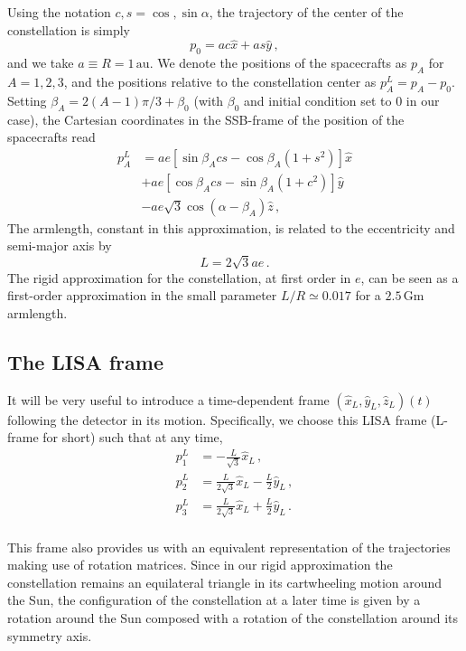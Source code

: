 \documentclass[aps,showpacs,twocolumn,prd,superscriptaddress,nofootinbib]{revtex4-1}
\newcommand{\be}{\begin{equation}}
\newcommand{\ee}{\end{equation}}
\newcommand{\bsub}{\begin{subequations}}
\newcommand{\esub}{\end{subequations}}
\newcommand{\nn}{\nonumber}
\begin{document}
Using the notation $c,s = \cos, \sin \alpha$, the trajectory of the center of the constellation is simply
\be
	p_{0} = ac \hat{x} + as \hat{y} \,,
\ee
and we take $a\equiv R = 1 \, \mathrm{au}$. We denote the positions of the spacecrafts as $p_{A}$ for $A=1,2,3$, and the positions relative to the constellation center as $p_{A}^{L} = p_{A} - p_{0}$. Setting $\beta_{A} = 2(A-1)\pi/3 + \beta_{0}$ (with $\beta_{0}$ and initial condition set to 0 in our case), the Cartesian coordinates in the SSB-frame of the position of the spacecrafts read
\bsub
\begin{align}
	p_{A}^{L} &= a e \left[ \sin \beta_{A} c s - \cos\beta_{A} \left( 1 + s^{2} \right) \right] \hat{x} \nn\\
	& + a e \left[ \cos \beta_{A} c s - \sin\beta_{A} \left( 1 + c^{2} \right) \right] \hat{y} \nn\\
	& - a e \sqrt{3} \cos(\alpha - \beta_{A}) \hat{z} \,,
\end{align}
\esub
The armlength, constant in this approximation, is related to the eccentricity and semi-major axis by
\be
	L = 2\sqrt{3} a e \,.
\ee
The rigid approximation for the constellation, at first order in $e$, can be seen as a first-order approximation in the small parameter $L/R \simeq 0.017$ for a $2.5 \, \mathrm{Gm}$ armlength.


\subsection{The LISA frame}
\label{app:LISAframe}

It will be very useful to introduce a time-dependent frame $(\hat{x}_{L}, \hat{y}_{L}, \hat{z}_{L})(t)$ following the detector in its motion. Specifically, we choose this LISA frame (L-frame for short) such that at any time,
\bsub
\begin{align}
	p_{1}^{L} &= - \frac{L}{\sqrt{3}} \hat{x}_{L} \,,\\
	p_{2}^{L} &= \frac{L}{2\sqrt{3}} \hat{x}_{L} - \frac{L}{2} \hat{y}_{L} \,,\\
	p_{3}^{L} &= \frac{L}{2\sqrt{3}} \hat{x}_{L} + \frac{L}{2} \hat{y}_{L} \,.\\
\end{align}
\esub

This frame also provides us with an equivalent representation of the trajectories making use of rotation matrices. Since in our rigid approximation the constellation remains an equilateral triangle in its cartwheeling motion around the Sun, the configuration of the constellation at a later time is given by a rotation around the Sun composed with a rotation of the constellation around its symmetry axis.
\end{document}
